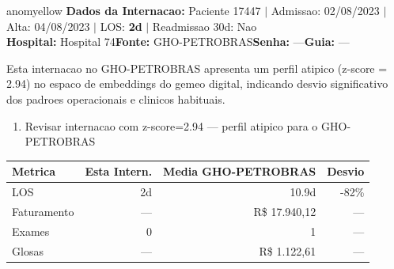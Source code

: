 \documentclass[a4paper,10pt]{article}
\begin{document}
\begin{anomalycard}[Internacao 58046 | GHO-PETROBRAS | MODERADO (z=2.94)]{anomyellow}
\textbf{Dados da Internacao:} Paciente 17447 $\mid$ Admissao: 02/08/2023 $\mid$ Alta: 04/08/2023 $\mid$ LOS: \textbf{2d} $\mid$ Readmissao 30d: Nao\\
\textbf{Hospital:} Hospital 74\quad\textbf{Fonte:} GHO-PETROBRAS\quad\textbf{Senha:} ---\quad\textbf{Guia:} ---\\
\vspace{2pt}\begin{tcolorbox}[colback=severityred!20,colframe=anomyellow,title={\textbf{Interpretacao de Negocio}},fonttitle=\bfseries\small,left=4pt,right=4pt,top=3pt,bottom=3pt]
{\small Esta internacao no GHO-PETROBRAS apresenta um perfil atipico (z-score = 2.94) no espaco de embeddings do gemeo digital, indicando desvio significativo dos padroes operacionais e clinicos habituais.}
\end{tcolorbox}
\begin{tcolorbox}[colback=severityyellow!30,colframe=anomorange,title={\textbf{Recomendacoes Especificas}},fonttitle=\bfseries\small,left=4pt,right=4pt,top=3pt,bottom=3pt]
\begin{enumerate}[nosep,leftmargin=16pt]
\item {\small Revisar internacao com z-score=2.94 --- perfil atipico para o GHO-PETROBRAS}
\end{enumerate}
\end{tcolorbox}
\begin{center}\begin{tabular}{l r r r}\toprule\textbf{Metrica} & \textbf{Esta Intern.} & \textbf{Media GHO-PETROBRAS} & \textbf{Desvio} \\\midrule
LOS & 2d & 10.9d & -82\% \\
Faturamento & --- & R\$ 17.940,12 & --- \\
Exames & 0 & 1 & --- \\
Glosas & --- & R\$ 1.122,61 & --- \\
\bottomrule\end{tabular}\end{center}


\end{anomalycard}
\end{document}
